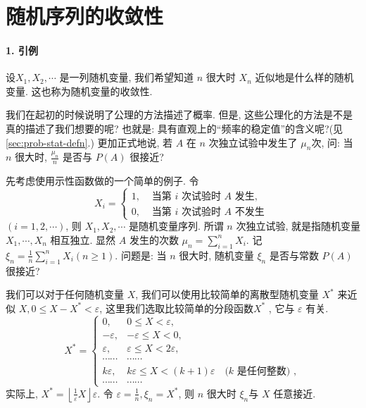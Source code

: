 \section{随机序列的收敛性}

\paragraph{1. 引例} 设$X_1, X_2, \cdots$ 是一列随机变量, 我们希望知道 $n$ 很大时 $X_n$ 近似地是什么样的随机变量. 这也称为随机变量的收敛性. 

我们在起初的时候说明了公理的方法描述了概率. 但是, 这些公理化的方法是不是真的描述了我们想要的呢? 也就是: 具有直观上的“频率的稳定值”的含义呢?(见\cref{sec:prob-stat-defn}.) 更加正式地说, 若 $A$ 在 $n$ 次独立试验中发生了 $\mu_n$次, 问: 当 $n$ 很大时, $\frac{\mu_n}{n}$ 是否与 $P(A)$ 很接近?

\begin{example}
    先考虑使用示性函数做的一个简单的例子. 令$$
    X_i= \begin{cases}1, & \text { 当第 } i \text { 次试验时 } A \text { 发生, } \\ 0, & \text { 当第 } i \text { 次试验时 } A \text { 不发生 }\end{cases}
    $$
    $(i=1,2, \cdots)$, 则 $X_1, X_2, \cdots$ 是随机变量序列. 所谓 $n$ 次独立试验, 就是指随机变量 $X_1, \cdots, X_n$ 相互独立. 显然 $A$ 发生的次数 $\mu_n=\sum_{i=1}^n X_i$. 记 $\xi_n=\frac{1}{n} \sum_{i=1}^n X_i(n \geqslant 1)$. 问题是: 当 $n$ 很大时, 随机变量 $\xi_n$ 是否与常数 $P(A)$ 很接近?

    我们可以对于任何随机变量 $X$, 我们可以使用比较简单的离散型随机变量 $X^*$ 来近似 $X, 0 \leqslant X-X^*<\varepsilon$, 这里我们选取比较简单的分段函数$X^*$ , 它与 $\varepsilon$ 有关.$$
    X^*= \begin{cases}0, & 0 \leqslant X<\varepsilon, \\ -\varepsilon, & -\varepsilon \leqslant X<0, \\ \varepsilon, & \varepsilon \leqslant X<2 \varepsilon, \\ \cdots \cdots & \cdots \cdots \\ k \varepsilon, & k \varepsilon \leqslant X<(k+1) \varepsilon \quad(k \text { 是任何整数) }, \\ \cdots \cdots & \cdots \cdots\end{cases}
    $$
     实际上, $X^*=\left\lfloor\frac{1}{\varepsilon} X\right\rfloor \varepsilon$. 令 $\varepsilon=\frac{1}{n}, \xi_n=X^*$, 则 $n$ 很大时 $\xi_n$与 $X$ 任意接近.
\end{example}

